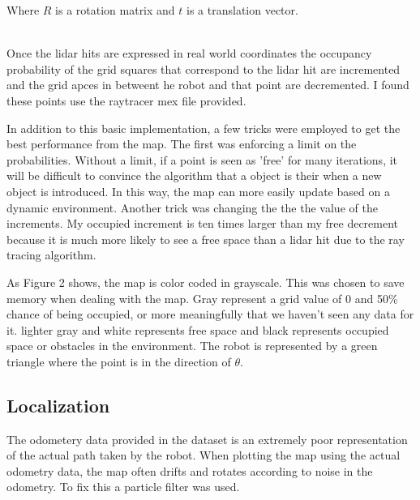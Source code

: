 \documentclass{article}
\begin{document}
Where $R$ is a rotation matrix and $t$ is a translation vector. 
\\
\\
\par
Once the lidar hits are expressed in real world coordinates the occupancy probability of the grid squares that correspond to the lidar hit are incremented and the grid apces in betweent he robot and that point are decremented. I found these points use the raytracer mex file provided. 
\par
In addition to this basic implementation, a few tricks were employed to get the best performance from the map. The first was enforcing a limit on the probabilities. Without a limit, if a point is seen as 'free' for many iterations, it will be difficult to convince the algorithm that a object is their when a new object is introduced. In this way, the map can more easily update based on a dynamic environment. Another trick was changing the the the value of the increments. My occupied increment is ten times larger than my free decrement because it is much more likely to see a free space than a lidar hit due to the ray tracing algorithm. 
\par
As Figure 2 shows, the map is color coded in grayscale. This was chosen to save memory when dealing with the map. Gray represent a grid value of 0 and 50\% chance of being occupied, or more meaningfully that we haven't seen any data for it. lighter gray and white represents free space and black represents occupied space or obstacles in the environment. The robot is represented by a green triangle where the point is in the direction of $\theta$.


\subsection{Localization}
\par
The odometery data provided in the dataset is an extremely poor representation of the actual path taken by the robot. When plotting the map using the actual odometry data, the map often drifts and rotates according to noise in the odometry. To fix this a particle filter was used.
\end{document}
